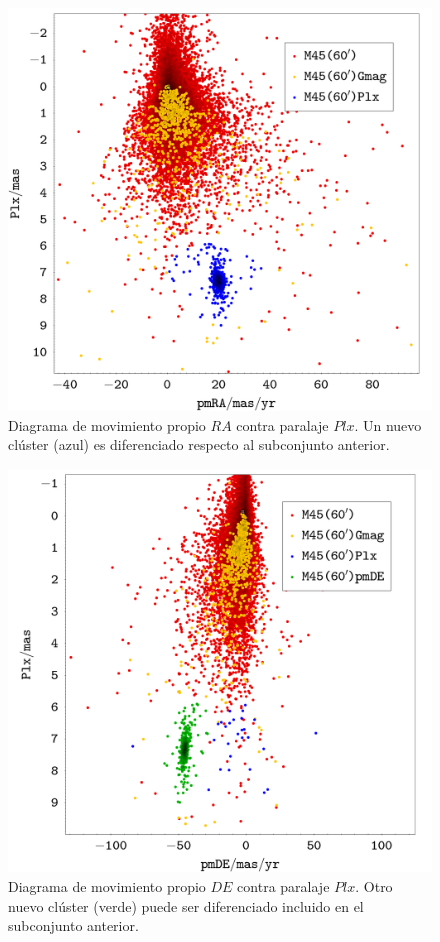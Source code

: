 \documentclass[a4paper,fleqn,usenatbib]{mnras}
\begin{document}
\begin{figure}
  \includegraphics[width=\linewidth]{img/ejercicio2_m45_plx_pmra}
  \caption{Diagrama de movimiento propio $RA$ contra paralaje $Plx$. Un nuevo clúster (azul) es diferenciado respecto al subconjunto anterior.}
  \label{fig:e2_plx}
\end{figure}

\begin{figure}
  \includegraphics[width=\linewidth]{img/ejercicio2_m45_plx_pmde}
  \caption{Diagrama de movimiento propio $DE$ contra paralaje $Plx$. Otro nuevo clúster (verde) puede ser diferenciado incluido en el subconjunto anterior.}
  \label{fig:e2_pmde}
\end{figure}
\end{document}
